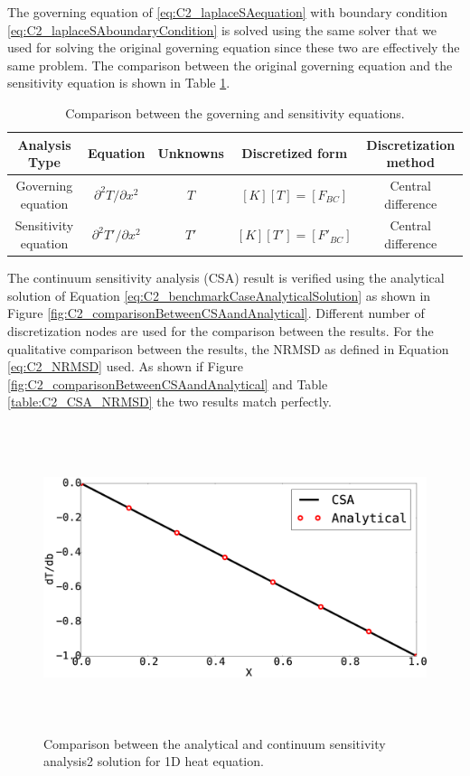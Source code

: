 The governing equation of \eqref{eq:C2_laplaceSAequation} with boundary condition \eqref{eq:C2_laplaceSAboundaryCondition} is solved using the same solver that we used for solving the original governing equation since these two are effectively the same problem. The comparison between the original governing equation and the sensitivity equation is shown in Table \ref{table:C2_comparisonBetweenGEandSA}.

\begin{center}
\begin{table}[h]
\begin{tabular}{c | c | c | c | c}
	Analysis Type & Equation & Unknowns & Discretized form & Discretization method \\ \hline \hline
	Governing equation & $\partial^2 T/\partial x^2$ & $T$ & $[K][T] = [F_{BC}]$ & Central difference \\ \hline
	Sensitivity equation & $\partial^2 T'/\partial x^2$ & $T'$ & $[K][T'] = [F'_{BC}]$ & Central difference
\end{tabular}
\caption{Comparison between the governing and sensitivity equations.}
\label{table:C2_comparisonBetweenGEandSA}
\end{table}
\end{center}

The continuum sensitivity analysis (CSA) result is verified using the analytical solution of Equation \eqref{eq:C2_benchmarkCaseAnalyticalSolution} as shown in Figure \ref{fig:C2_comparisonBetweenCSAandAnalytical}. Different number of discretization nodes are used for the comparison between the results. For the qualitative comparison between the results, the NRMSD as defined in Equation \eqref{eq:C2_NRMSD} used. As shown if Figure \ref{fig:C2_comparisonBetweenCSAandAnalytical} and Table \ref{table:C2_CSA_NRMSD} the two results match perfectly.

\begin{figure}[h]
	\centering
	\includegraphics[height=9.00cm]{Chapter_2/figure/SA_CSA_vs_analytical.eps}
	\caption{Comparison between the analytical and continuum sensitivity analysis2 solution for 1D heat equation.}
	\label{fig:C2_verificationOfSolver}
\end{figure}

